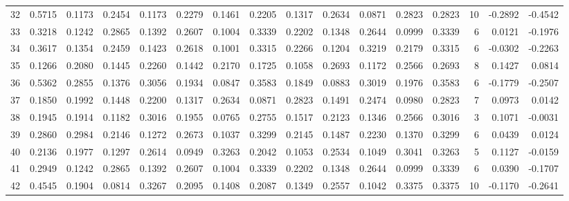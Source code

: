 \begin{tabular}{lrrrrrrrrrrrrrrr}
32  &      0.5715 &  0.1173 &  0.2454 &  0.1173 &  0.2279 &  0.1461 &  0.2205 &  0.1317 &  0.2634 &  0.0871 &   0.2823 &     0.2823 &     10 &                   -0.2892 &                    -0.4542 \\
33  &      0.3218 &  0.1242 &  0.2865 &  0.1392 &  0.2607 &  0.1004 &  0.3339 &  0.2202 &  0.1348 &  0.2644 &   0.0999 &     0.3339 &      6 &                    0.0121 &                    -0.1976 \\
34  &      0.3617 &  0.1354 &  0.2459 &  0.1423 &  0.2618 &  0.1001 &  0.3315 &  0.2266 &  0.1204 &  0.3219 &   0.2179 &     0.3315 &      6 &                   -0.0302 &                    -0.2263 \\
35  &      0.1266 &  0.2080 &  0.1445 &  0.2260 &  0.1442 &  0.2170 &  0.1725 &  0.1058 &  0.2693 &  0.1172 &   0.2566 &     0.2693 &      8 &                    0.1427 &                     0.0814 \\
36  &      0.5362 &  0.2855 &  0.1376 &  0.3056 &  0.1934 &  0.0847 &  0.3583 &  0.1849 &  0.0883 &  0.3019 &   0.1976 &     0.3583 &      6 &                   -0.1779 &                    -0.2507 \\
37  &      0.1850 &  0.1992 &  0.1448 &  0.2200 &  0.1317 &  0.2634 &  0.0871 &  0.2823 &  0.1491 &  0.2474 &   0.0980 &     0.2823 &      7 &                    0.0973 &                     0.0142 \\
38  &      0.1945 &  0.1914 &  0.1182 &  0.3016 &  0.1955 &  0.0765 &  0.2755 &  0.1517 &  0.2123 &  0.1346 &   0.2566 &     0.3016 &      3 &                    0.1071 &                    -0.0031 \\
39  &      0.2860 &  0.2984 &  0.2146 &  0.1272 &  0.2673 &  0.1037 &  0.3299 &  0.2145 &  0.1487 &  0.2230 &   0.1370 &     0.3299 &      6 &                    0.0439 &                     0.0124 \\
40  &      0.2136 &  0.1977 &  0.1297 &  0.2614 &  0.0949 &  0.3263 &  0.2042 &  0.1053 &  0.2534 &  0.1049 &   0.3041 &     0.3263 &      5 &                    0.1127 &                    -0.0159 \\
41  &      0.2949 &  0.1242 &  0.2865 &  0.1392 &  0.2607 &  0.1004 &  0.3339 &  0.2202 &  0.1348 &  0.2644 &   0.0999 &     0.3339 &      6 &                    0.0390 &                    -0.1707 \\
42  &      0.4545 &  0.1904 &  0.0814 &  0.3267 &  0.2095 &  0.1408 &  0.2087 &  0.1349 &  0.2557 &  0.1042 &   0.3375 &     0.3375 &     10 &                   -0.1170 &                    -0.2641 \\

\end{tabular}
